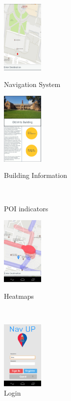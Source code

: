 \documentclass{article}
\begin{document}
\begin{figure}[h]
\centering
\begin{minipage}{.5\textwidth}
	\centering
	\includegraphics[width=2cm]{Navigation}
	\caption{Navigation System}
\end{minipage}%
\begin{minipage}{.5\textwidth}
	\centering
	\includegraphics[width=2cm]{BuildingInfo}
	\caption{Building Information}
\end{minipage}%
\\
\begin{minipage}{.5\textwidth}
	\centering
	\caption{POI indicators}
\end{minipage}%
\begin{minipage}{.5\textwidth}
	\centering
	\includegraphics[width=2cm]{heatmaps}
	\caption{Heatmaps}
\end{minipage}%
\\
\begin{minipage}{.5\textwidth}
	\centering
	\includegraphics[width=2cm]{LogIn}
	\caption{Login}
\end{minipage}%
\end{figure}
\end{document}
